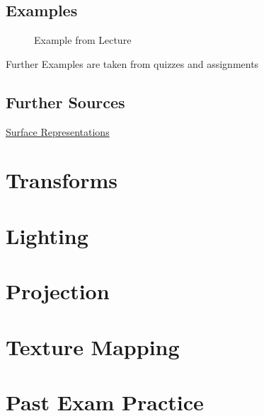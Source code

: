 \subsection{Examples}
   \begin{figure}[!htb]
	\caption{\label{fig:pyramidPolygons} Example from Lecture}
	\end{figure}
Further Examples are taken from quizzes and assignments
\subsection{Further Sources}
	\href{https://www.tutorialspoint.com/computer_graphics/computer_graphics_surfaces.htm}{Surface Representations}
\newpage
\section{Transforms}
\newpage
\section{Lighting}
\newpage
\section{Projection}
\newpage
\section{Texture Mapping}
\newpage
\section{Past Exam Practice}